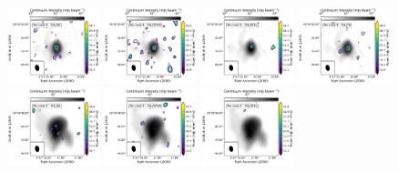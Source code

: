 \begin{figure}[htbp!]
  \centering
  \includegraphics[width=0.24\textwidth]{./moment0/Set3_ID05_CH3OH_243915.pdf}
  \includegraphics[width=0.24\textwidth]{./moment0/Set3_ID05_CH3OCHO_259342.pdf}
  \includegraphics[width=0.24\textwidth]{./moment0/Set3_ID05_CH3OCH3_259311.pdf}
  \includegraphics[width=0.24\textwidth]{./moment0/Set3_ID05_CH3CN_257527.pdf}
  \\
  \includegraphics[width=0.24\textwidth]{./moment0/Set3_ID04_CH3OH_243915.pdf}
  \includegraphics[width=0.24\textwidth]{./moment0/Set3_ID04_CH3OCHO_259342.pdf}
  \includegraphics[width=0.24\textwidth]{./moment0/Set3_ID04_CH3OCH3_259311.pdf}

\end{figure}
